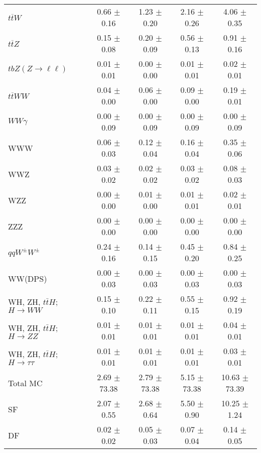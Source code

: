 \begin{tabular}{l|cccc}
                   $t\overline{t}W$ &  0.66 $\pm$  0.16 &  1.23 $\pm$  0.20 &  2.16 $\pm$  0.26 &  4.06 $\pm$  0.35 \\
                   $t\overline{t}Z$ &  0.15 $\pm$  0.08 &  0.20 $\pm$  0.09 &  0.56 $\pm$  0.13 &  0.91 $\pm$  0.16 \\
    $tbZ (Z \rightarrow \ell \ell)$ &  0.01 $\pm$  0.01 &  0.00 $\pm$  0.00 &  0.01 $\pm$  0.01 &  0.02 $\pm$  0.01 \\
                  $t\overline{t}WW$ &  0.04 $\pm$  0.00 &  0.06 $\pm$  0.00 &  0.09 $\pm$  0.00 &  0.19 $\pm$  0.01 \\
                         $WW\gamma$ &  0.00 $\pm$  0.09 &  0.00 $\pm$  0.09 &  0.00 $\pm$  0.09 &  0.00 $\pm$  0.09 \\
                                WWW &  0.06 $\pm$  0.03 &  0.12 $\pm$  0.04 &  0.16 $\pm$  0.04 &  0.35 $\pm$  0.06 \\
                                WWZ &  0.03 $\pm$  0.02 &  0.02 $\pm$  0.02 &  0.03 $\pm$  0.02 &  0.08 $\pm$  0.03 \\
                                WZZ &  0.00 $\pm$  0.00 &  0.01 $\pm$  0.00 &  0.01 $\pm$  0.01 &  0.02 $\pm$  0.01 \\
                                ZZZ &  0.00 $\pm$  0.00 &  0.00 $\pm$  0.00 &  0.00 $\pm$  0.00 &  0.00 $\pm$  0.00 \\
                 $qqW^{\pm}W^{\pm}$ &  0.24 $\pm$  0.16 &  0.14 $\pm$  0.15 &  0.45 $\pm$  0.20 &  0.84 $\pm$  0.25 \\
                            WW(DPS) &  0.00 $\pm$  0.03 &  0.00 $\pm$  0.03 &  0.00 $\pm$  0.03 &  0.00 $\pm$  0.03 \\
WH, ZH, $t\bar{t}H$; $H \rightarrow WW$ &  0.15 $\pm$  0.10 &  0.22 $\pm$  0.11 &  0.55 $\pm$  0.15 &  0.92 $\pm$  0.19 \\
WH, ZH, $t\bar{t}H$; $H \rightarrow ZZ$ &  0.01 $\pm$  0.01 &  0.01 $\pm$  0.01 &  0.01 $\pm$  0.01 &  0.04 $\pm$  0.01 \\
WH, ZH, $t\bar{t}H$; $H \rightarrow \tau\tau$ &  0.01 $\pm$  0.01 &  0.01 $\pm$  0.01 &  0.01 $\pm$  0.01 &  0.03 $\pm$  0.01 \\
\hline\hline
                           Total MC &  2.69 $\pm$ 73.38 &  2.79 $\pm$ 73.38 &  5.15 $\pm$ 73.38 & 10.63 $\pm$ 73.39 \\
\hline
                                 SF &  2.07 $\pm$  0.55 &  2.68 $\pm$  0.64 &  5.50 $\pm$  0.90 & 10.25 $\pm$  1.24 \\
                                 DF &  0.02 $\pm$  0.02 &  0.05 $\pm$  0.03 &  0.07 $\pm$  0.04 &  0.14 $\pm$  0.05 \\

\end{tabular}
